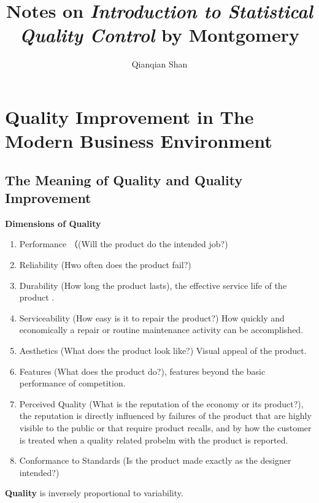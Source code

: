 \documentclass[12pt,oneside,a4paper]{article}
\author{Qianqian Shan}
\title{Notes on \emph{Introduction to Statistical Quality Control} by Montgomery}
\date{\vspace{-5ex}}
\numberwithin{equation}{section}
\begin{document}
\maketitle
\tableofcontents
\newpage
\section{Quality Improvement in The Modern Business Environment}
\subsection{The Meaning of Quality and Quality Improvement}

\textbf{Dimensions of Quality}


\begin{enumerate}

\item Performance （(Will the product do the intended job?)

\item Reliability (Hwo often does the product fail?)

\item Durability (How long the product lasts), the effective service life of the product . 

\item Serviceability (How easy is it to repair the product?) How quickly and economically a repair or routine maintenance activity can be accomplished. 

\item Aesthetics (What does the product look like?) Visual appeal of the product. 

\item Features (What does the product do?), features beyond the basic performance of competition. 

\item Perceived Quality (What is the reputation of the economy or its product?), the reputation is directly influenced by failures of the product that are highly visible to the public or that require product recalls, and by how the customer is treated when a quality related probelm with the product is reported. 

\item Conformance to Standards (Is the product made exactly as the designer intended?)
\end{enumerate}

\textbf{Quality} is inversely proportional to variability. 
\end{document}
